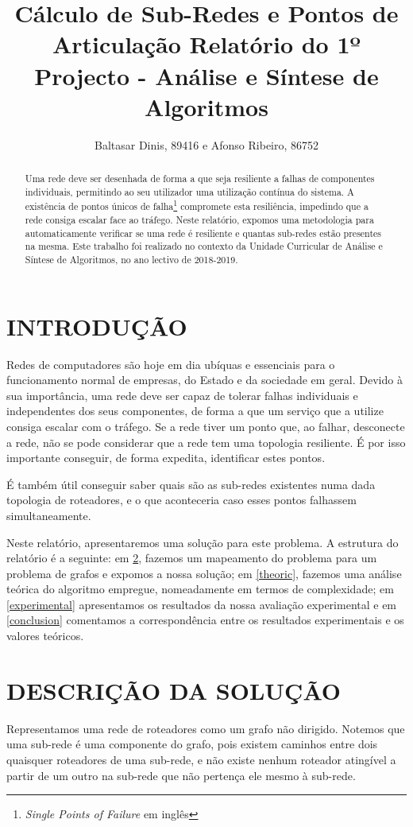 \documentclass[a4paper, 12pt, conference, portuguese]{ieeeconf}
\title{{\LARGE \bf Cálculo de Sub-Redes e Pontos de Articulação}
\large{Relatório do 1º Projecto - Análise e Síntese de Algoritmos} }
\author{Baltasar Dinis, 89416 e Afonso Ribeiro, 86752}
\begin{document}
\maketitle
\thispagestyle{empty}
\pagestyle{empty}

\begin{abstract}
  Uma rede deve ser desenhada de forma a que seja resiliente a falhas de
  componentes individuais, permitindo ao seu utilizador uma utilização contínua
  do sistema. A existência de pontos únicos de falha\footnote{\textit{Single
  Points of Failure} em inglês} compromete esta resiliência, impedindo que a
  rede consiga escalar face ao tráfego. Neste relatório, expomos uma
  metodologia para automaticamente verificar se uma rede é resiliente e quantas
  sub-redes estão presentes na mesma. Este trabalho foi realizado no contexto da
  Unidade Curricular de Análise e Síntese de Algoritmos, no ano lectivo de
  2018-2019.
\end{abstract}



\section{INTRODUÇÃO}\label{intro}
Redes de computadores são hoje em dia ubíquas e essenciais para o funcionamento
normal de empresas, do Estado e da sociedade em geral. Devido à sua importância,
uma rede deve ser capaz de tolerar falhas individuais e independentes dos seus
componentes, de forma a que um serviço que a utilize consiga escalar com o
tráfego. Se a rede tiver um ponto que, ao falhar, desconecte a rede, não se pode considerar que a rede tem uma topologia
resiliente. É por isso importante conseguir, de forma expedita, identificar
estes pontos.

É também útil conseguir saber quais são as sub-redes existentes numa dada
topologia de roteadores, e o que aconteceria caso esses pontos falhassem
simultaneamente.

Neste relatório, apresentaremos uma solução para este problema. A estrutura
do relatório é a seguinte: em \ref{sol},
fazemos um mapeamento do problema para um problema de grafos e
expomos a nossa solução; em \ref{theoric}, fazemos uma análise teórica do
algoritmo empregue, nomeadamente em termos de complexidade; em
\ref{experimental} apresentamos os resultados da nossa avaliação experimental e
em \ref{conclusion} comentamos a correspondência entre os resultados
experimentais e os valores teóricos.

\section{DESCRIÇÃO DA SOLUÇÃO}\label{sol}
Representamos uma rede de roteadores como um grafo não dirigido. Notemos que uma
sub-rede é uma componente do grafo, pois existem caminhos entre dois quaisquer
roteadores de uma sub-rede, e não existe nenhum roteador atingível a partir de
um outro na sub-rede que não pertença ele mesmo à sub-rede.
\end{document}
